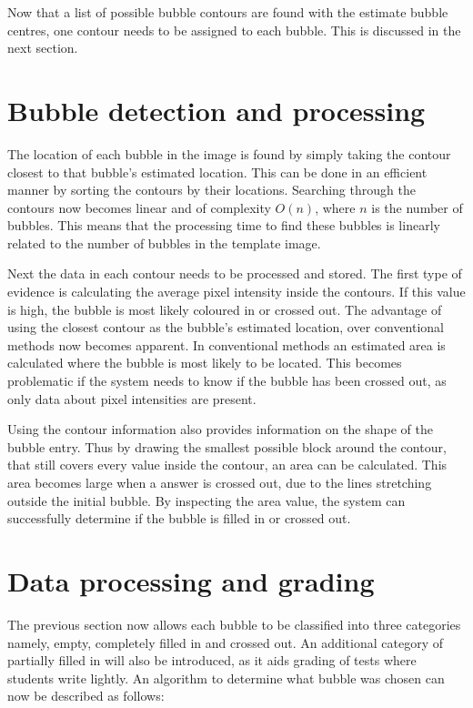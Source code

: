 Now that a list of possible bubble contours are found with the estimate bubble centres, one contour needs to be assigned to each bubble. This is discussed in the next section.

\section{Bubble detection and processing}
The location of each bubble in the image is found by simply taking the contour closest to that bubble's estimated location. This can be done in an efficient manner by sorting the contours by their locations. Searching through the contours now becomes linear and of complexity $O(n)$, where $n$ is the number of bubbles. This means that the processing time to find these bubbles is linearly related to the number of bubbles in the template image. 

Next the data in each contour needs to be processed and stored. The first type of evidence is calculating the average pixel intensity inside the contours. If this value is high, the bubble is most likely coloured in or crossed out. The advantage of using the closest contour as the bubble's estimated location, over conventional methods now becomes apparent. In conventional methods an estimated area is calculated where the bubble is most likely to be located. This becomes problematic if the system needs to know if the bubble has been crossed out, as only data about pixel intensities are present. 

Using the contour information also provides information on the shape of the bubble entry. Thus by drawing the smallest possible block around the contour, that still covers every value inside the contour, an area can be calculated. This area becomes large when a answer is crossed out, due to the lines stretching outside the initial bubble. By inspecting the area value, the system can successfully determine if the bubble is filled in or crossed out.

\section{Data processing and grading}

The previous section now allows each bubble to be classified into three categories namely, empty, completely filled in and crossed out. An additional category of partially filled in will also be introduced, as it aids grading of tests where students write lightly. An algorithm to determine what bubble was chosen can now be described as follows:

